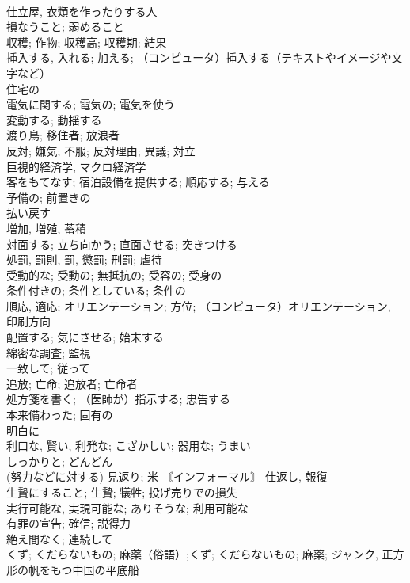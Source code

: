 \documentclass[8pt]{extreport}
\begin{document}
\begin{CJK}{UTF8}{min}
\\	仕立屋, 衣類を作ったりする人	
\\	損なうこと; 弱めること	
\\	収穫; 作物; 収穫高; 収穫期; 結果	
\\	挿入する, 入れる; 加える; （コンピュータ）挿入する（テキストやイメージや文字など）	
\\	住宅の	
\\	電気に関する; 電気の; 電気を使う	
\\	変動する; 動揺する	
\\	渡り鳥; 移住者; 放浪者	
\\	反対; 嫌気; 不服; 反対理由; 異議; 対立	
\\	巨視的経済学, マクロ経済学	
\\	客をもてなす; 宿泊設備を提供する; 順応する; 与える	
\\	予備の; 前置きの	
\\	払い戻す	
\\	増加, 増殖, 蓄積	
\\	対面する; 立ち向かう; 直面させる; 突きつける	
\\	処罰, 罰則, 罰, 懲罰; 刑罰; 虐待	
\\	受動的な; 受動の; 無抵抗の; 受容の; 受身の	
\\	条件付きの; 条件としている; 条件の	
\\	順応, 適応; オリエンテーション; 方位; （コンピュータ）オリエンテーション, 印刷方向	
\\	配置する; 気にさせる; 始末する	
\\	綿密な調査; 監視	
\\	一致して; 従って	
\\	追放; 亡命; 追放者; 亡命者	
\\	処方箋を書く; （医師が）指示する; 忠告する	
\\	本来備わった; 固有の	
\\	明白に	
\\	利口な, 賢い, 利発な; こざかしい; 器用な; うまい	
\\	しっかりと; どんどん	
\\	(努力などに対する) 見返り; 米 〘インフォーマル〙 仕返し, 報復	
\\	生贄にすること; 生贄; 犠牲; 投げ売りでの損失	
\\	実行可能な, 実現可能な; ありそうな; 利用可能な	
\\	有罪の宣告; 確信; 説得力	
\\	絶え間なく; 連続して	
\\	くず; くだらないもの; 麻薬（俗語）;くず; くだらないもの; 麻薬; ジャンク, 正方形の帆をもつ中国の平底船	

\end{CJK}
\end{document}
